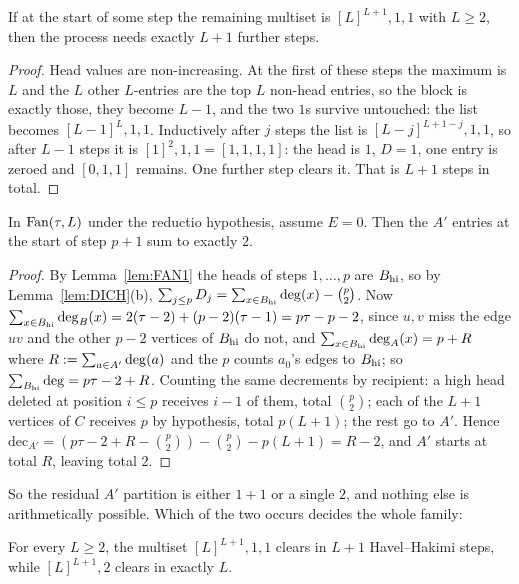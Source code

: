 \begin{lemma}\label{lem:FAN3}
If at the start of some step the remaining multiset is $[L]^{L+1},1,1$ with $L \ge 2$, then
the process needs exactly $L+1$ further steps.
\end{lemma}

\begin{proof}
Head values are non-increasing. At the first of these steps the maximum is $L$ and the $L$
other $L$-entries are the top $L$ non-head entries, so the block is exactly those, they
become $L-1$, and the two $1$s survive untouched: the list becomes $[L-1]^{L},1,1$.
Inductively after $j$ steps the list is $[L-j]^{L+1-j},1,1$, so after $L-1$ steps it is
$[1]^{2},1,1 = [1,1,1,1]$: the head is $1$, $D = 1$, one entry is zeroed and $[0,1,1]$
remains. One further step clears it. That is $L+1$ steps in total.
\end{proof}

\begin{lemma}\label{lem:FAN4}
In $\mathrm{Fan}(\tau,L)$ under the reductio hypothesis, assume $E = 0$. Then the $A'$ entries at
the start of step $p+1$ sum to exactly $2$.
\end{lemma}

\begin{proof}
By Lemma~\ref{lem:FAN1} the heads of steps $1,\dots,p$ are $B_{\mathrm{hi}}$, so by
Lemma~\ref{lem:DICH}(b),
$\sum_{j \le p} D_j = \sum_{x \in B_{\mathrm{hi}}}\mathrm{deg}(x) - \binom{p}{2}$. Now
$\sum_{x \in B_{\mathrm{hi}}}\mathrm{deg}_B(x) = 2(\tau-2) + (p-2)(\tau-1) = p\tau - p - 2$, since $u,v$ miss
the edge $uv$ and the other $p-2$ vertices of $B_{\mathrm{hi}}$ do not, and
$\sum_{x \in B_{\mathrm{hi}}}\mathrm{deg}_A(x) = p + R$ where $R := \sum_{a \in A'}\mathrm{deg}(a)$ and the $p$ counts
$a_0$'s edges to $B_{\mathrm{hi}}$; so $\sum_{B_{\mathrm{hi}}}\mathrm{deg} = p\tau - 2 + R$. Counting the same decrements
by recipient: a high head deleted at position $i \le p$ receives $i-1$ of them, total
$\binom{p}{2}$; each of the $L+1$ vertices of $C$ receives $p$ by hypothesis, total
$p(L+1)$; the rest go to $A'$. Hence
$\mathrm{dec}_{A'} = (p\tau - 2 + R - \binom{p}{2}) - \binom{p}{2} - p(L+1) = R - 2$, and
$A'$ starts at total $R$, leaving total $2$.
\end{proof}

So the residual $A'$ partition is either $1+1$ or a single $2$, and nothing else is
arithmetically possible. Which of the two occurs decides the whole family:

\begin{observation}\label{obs:FAN5}
For every $L \ge 2$, the multiset $[L]^{L+1},1,1$ clears in $L+1$ Havel--Hakimi steps, while
$[L]^{L+1},2$ clears in exactly $L$.
\end{observation}

